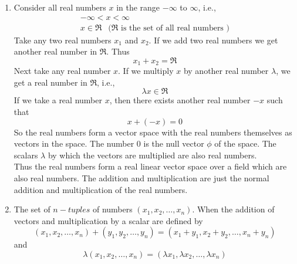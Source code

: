 \begin{enumerate}
	\item 
	Consider all real numbers $x$ in the range $-\infty$ to $\infty$, i.e.,
	\begin{eqnarray}\label{eqn:2.10-2.11}
		-\infty < x < \infty \\
		x \in \Re \ \ \text{ ($\Re$ is the set of all real numbers )}
	\end{eqnarray}
	Take any two real numbers $x_1$ and $x_2$. If we add two real numbers we get another real number in $\Re$. Thus
	\begin{equation}\label{eqn:2.12}
	x_1 + x_2 = \Re
	\end{equation}
	Next take any real number $x$. If we multiply $x$ by another real number $\lambda$, we get a real number in $\Re$, i.e.,
	\begin{equation}\label{eqn:2.13}
	\lambda x \in \Re
	\end{equation}
	If we take a real number $x$, then there exists another real number $-x$ such that
	\begin{equation}\label{eqn:2.14}
	x + (-x) = 0
	\end{equation}
	So the real numbers form a vector space with the real numbers themselves as vectors in the space. The number $0$ is the null vector $\phi$ of the  space. The scalars $\lambda$ by which the vectors are multiplied are also real numbers.\\
	Thus the real numbers form a real linear vector space over a field which are also real numbers. The addition and multiplication are just the normal addition and multiplication of the real numbers.
	
	\item 
	The set of $n-tuples$ of numbers $(x_1, x_2, \ldots, x_n)$.
	When the addition of vectors and multiplication by a scalar are defined by
	\begin{equation}\label{eqn:2.15}
	(x_1 , x_2, \ldots, x_n) + (y_1 , y_2, \ldots, y_n) = (x_1 + y_1, x_2 + y_2, \ldots, x_n + y_n)
	\end{equation}
	and 
	\begin{equation}\label{eqn:2.16}
	\lambda (x_1, x_2, \ldots, x_n) = (\lambda x_1, \lambda x_2, \ldots, \lambda x_n)
	\end{equation}
	

\end{enumerate}
